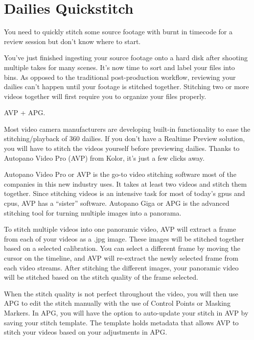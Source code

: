 \chapter{Dailies Quickstitch}
\pagecolor{white}
\label{chap:30}
\begin{fullwidth}

\problem

{\large You need to quickly stitch some source footage with burnt in timecode for a review session but don't know where to start. \par}

You've just finished ingesting your source footage onto a hard disk after shooting multiple takes for many scenes. It's now time to sort and label your files into bins. As opposed to the traditional post-production workflow, reviewing your dailies can't happen until your footage is stitched together. Stitching two or more videos together will first require you to organize your files properly.

\solution

{\large AVP + APG. \par}

Most video camera manufacturers are developing built-in functionality to ease the stitching/playback of 360 dailies. If you don't have a Realtime Preview solution, you will have to stitch the videos yourself before previewing dailies. Thanks to Autopano Video Pro (AVP) from Kolor, it's just a few clicks away.

Autopano Video Pro or AVP is the go-to video stitching software most of the companies in this new industry uses. It takes at least two videos and stitch them together. Since stitching videos is an intensive task for most of today’s gpus and cpus, AVP has a “sister” software. Autopano Giga or APG is the advanced stitching tool for turning multiple images into a panorama. 

To stitch multiple videos into one panoramic video, AVP will extract a frame from each of your videos as a .jpg image. These images will be stitched together based on a selected calibration. You can select a different frame by moving the cursor on the timeline, and AVP will re-extract the newly selected frame from each video streams. After stitching the different images, your panoramic video will be stitched based on the stitch quality of the frame selected. 


When the stitch quality is not perfect throughout the video, you will then use APG to edit the stitch manually with the use of Control Points or Masking Markers. In APG, you will have the option to auto-update your stitch in AVP by saving your stitch template. The template holds metadata that allows AVP to stitch your videos based on your adjustments in APG.


\end{fullwidth}

